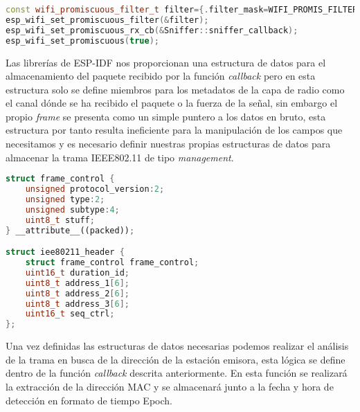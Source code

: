 \documentclass[../proyecto.tex]{subfiles}
\begin{document}
\begin{minipage}{\linewidth}
\begin{lstlisting}[language=C++, caption=Activación del modo promiscuo con filtrado, captionpos=b, frame=single]
const wifi_promiscuous_filter_t filter={.filter_mask=WIFI_PROMIS_FILTER_MASK_MGMT};
esp_wifi_set_promiscuous_filter(&filter);
esp_wifi_set_promiscuous_rx_cb(&Sniffer::sniffer_callback);
esp_wifi_set_promiscuous(true);
\end{lstlisting}
\end{minipage}

Las librerías de ESP-IDF nos proporcionan una estructura de datos para el almacenamiento del paquete recibido por la función \textit{callback} pero en esta estructura solo se define miembros para los metadatos de la capa de radio como el canal dónde se ha recibido el paquete o la fuerza de la señal, sin embargo el propio \textit{frame} se presenta como un simple puntero a los datos en bruto, esta estructura por tanto resulta ineficiente para la manipulación de los campos que necesitamos y es necesario definir nuestras propias estructuras de datos para almacenar la trama IEEE802.11 de tipo \textit{management}.\\

\begin{minipage}{\linewidth}
\begin{lstlisting}[language=C++, caption=Estructuras de datos para almacenamiento de las cabeceras IEEE802.11 , captionpos=b, frame=single]
struct frame_control {
    unsigned protocol_version:2;
    unsigned type:2;
    unsigned subtype:4;
    uint8_t stuff;
} __attribute__((packed));

struct iee80211_header {
    struct frame_control frame_control;
    uint16_t duration_id;
    uint8_t address_1[6];
    uint8_t address_2[6];
    uint8_t address_3[6];
    uint16_t seq_ctrl;
};
\end{lstlisting}
\end{minipage}

Una vez definidas las estructuras de datos necesarias podemos realizar el análisis de la trama en busca de la dirección de la estación emisora, esta lógica se define dentro de la función \textit{callback} descrita anteriormente. En esta función se realizará la extracción de la dirección MAC y se almacenará junto a la fecha y hora de detección en formato de tiempo Epoch.\\
\end{document}
